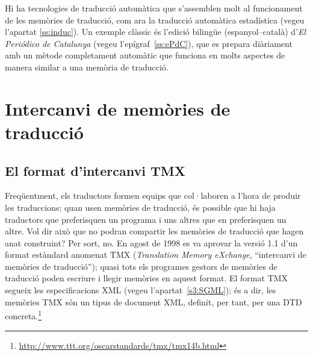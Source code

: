Hi ha tecnologies de traducció automàtica que s'assemblen molt al
funcionament de les memòries de traducció, com ara la traducció
automàtica estadística (vegeu l'apartat \ref{ss:induc}). Un exemple
clàssic és l'edició bilingüe (espanyol--català) d'\emph{El Periódico
  de Catalunya} (vegeu l'epígraf~\ref{ss:ePdC}), que es prepara
diàriament amb un mètode completament automàtic que funciona en molts
aspectes de manera similar a una memòria de traducció.



\section{Intercanvi de memòries de traducció}

\subsection{El format d'intercanvi TMX}

Freqüentment, els traductors formen equips que col·laboren a l'hora de
produir les traduccions; quan usen memòries de traducció, és possible
que hi haja traductors que preferisquen un programa i uns altres que
en preferisquen un altre. Vol dir això que no podran compartir les
memòries de traducció que hagen anat construint? Per sort, no. En
agost de 1998 es va aprovar la versió 1.1 d'un format estàndard
anomenat TMX (\emph{Translation Memory eXchange}, ``intercanvi de
memòries de traducció''); quasi tots els programes gestors de memòries
de traducció poden escriure i llegir memòries en aquest format.  El
format TMX segueix les especificacions XML (vegeu
l'apartat~\ref{s3:SGML}); és a dir, les memòries TMX són un tipus de
document XML, definit, per tant, per una DTD
concreta.\footnote{\url{http://www.ttt.org/oscarstandards/tmx/tmx14b.html}}

